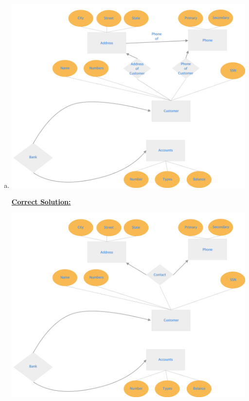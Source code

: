 \documentclass[12pt]{article}
\begin{document}
\begin{enumerate}[1.]
\begin{enumerate}[a)]
\begin{mdframed}
        \end{mdframed}

        \item

        \begin{center}
        \includegraphics[width=\linewidth]{images/worksheet_14_solution_21.png}
        \end{center}

        \bigskip

        \begin{mdframed}
            \underline{\textbf{Correct Solution:}}

            \bigskip

            \begin{center}
            \includegraphics[width=\linewidth]{images/worksheet_14_solution_22.png}
            \end{center}


\end{mdframed}
\end{enumerate}
\end{enumerate}
\end{document}
